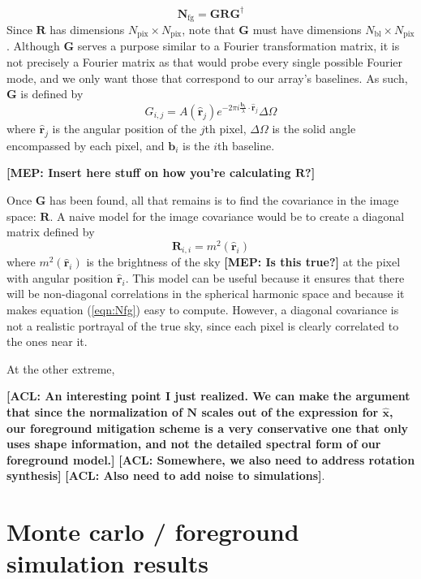 \documentclass[twolcolumn,apj]{emulateapj}
\newcommand{\Nfg}{\mathbf{N}_{\textrm{fg}}}
\newcommand{\R}{\mathbf{R}}
\newcommand{\rhat}{\hat{\mathbf{r}}}
\newcommand{\Nbl}{N_{\textrm{bl}}}
\newcommand{\acl}[1]{{\color{red} \textbf{[ACL:  #1]}}}
\newcommand{\mep}[1]{{\color{applegreen} \textbf{[MEP:  #1]}}}
\begin{document}
\begin{equation}
\Nfg = \mathbf{G} \R \mathbf{G}^\dagger
\label{eqn:Nfg}
\end{equation}
Since $\R$ has dimensions $N_{\textrm{pix}} \times N_{\textrm{pix}}$, note that $\mathbf{G}$ must have dimensions $\Nbl \times N_{\textrm{pix}}$. Although $\mathbf{G}$ serves a purpose similar to a Fourier transformation matrix, it is not precisely a Fourier matrix as that would probe every single possible Fourier mode, and we only want those that correspond to our array's baselines. As such, $\mathbf{G}$ is defined by 
\begin{equation}
G_{i,j} = A(\rhat_j)e^{-2\pi i \frac{\mathbf{b_\textit{i}}}{\lambda} \cdot \boldsymbol \rhat_j} \Delta \Omega
\end{equation}
where $\rhat_j$ is the angular position of the $j$th pixel,  $\Delta \Omega$ is the solid angle encompassed by each pixel, and $\mathbf{b_\textit{i}}$ is the $i$th baseline. 

\mep{Insert here stuff on how you're calculating $\R$?}

Once $\mathbf{G}$ has been found, all that remains is to find the covariance in the image space: $\R$. A naive model for the image covariance would be to create a diagonal matrix defined by 
\begin{equation}
\R_{i,i} = m^2(\rhat_i)
\end{equation}
where $m^2(\rhat_i)$ is the brightness of the sky \mep{Is this true?} at the pixel with angular position $\rhat_i$. This model can be useful because it ensures that there will be non-diagonal correlations in the spherical harmonic space and because it makes equation (\ref{eqn:Nfg}) easy to compute. However, a diagonal covariance is not a realistic portrayal of the true sky, since each pixel is clearly correlated to the ones near it. 

At the other extreme, 

\acl{An interesting point I just realized.  We can make the argument that since the normalization of $\mathbf{N}$ scales out of the expression for $\hat{\mathbf{x}}$, our foreground mitigation scheme is a very conservative one that only uses shape information, and not the detailed spectral form of our foreground model.}
\acl{Somewhere, we also need to address rotation synthesis}
\acl{Also need to add noise to simulations}.

\section{Monte carlo / foreground simulation results}
\label{sec:MonteCarlos}
\end{document}
